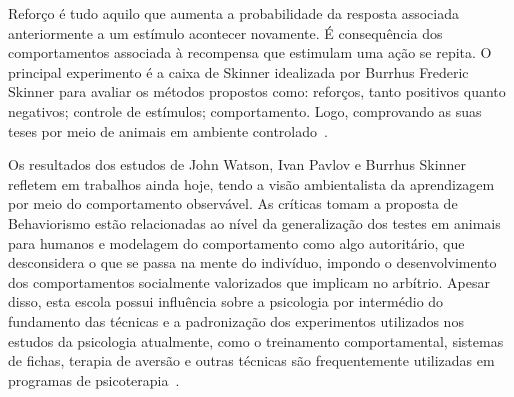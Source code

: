 Reforço é tudo aquilo que aumenta a probabilidade da resposta associada anteriormente a um estímulo acontecer novamente. É consequência dos comportamentos associada à recompensa que estimulam uma ação se repita.
O principal experimento é a caixa de Skinner idealizada por Burrhus Frederic Skinner para avaliar os  métodos propostos como: reforços, tanto positivos quanto negativos; controle de estímulos; comportamento.
Logo, comprovando as suas teses por meio de animais em ambiente controlado~\cite{silva2007psicologia_educacao}.

Os resultados dos estudos de John Watson, Ivan Pavlov e Burrhus Skinner refletem em trabalhos ainda hoje, tendo a visão ambientalista da aprendizagem por meio do comportamento observável. 
As críticas tomam a proposta de Behaviorismo estão relacionadas ao nível da generalização dos testes em animais para humanos e modelagem do comportamento como algo autoritário, que desconsidera o que se passa na mente do indivíduo, impondo o desenvolvimento dos comportamentos socialmente valorizados que implicam no arbítrio.
Apesar disso, esta escola possui influência sobre a psicologia por intermédio do fundamento das técnicas e a padronização dos experimentos utilizados nos estudos da psicologia atualmente, como o treinamento comportamental, sistemas de fichas, terapia de aversão e outras técnicas são frequentemente utilizadas em programas de psicoterapia~\cite{sternberg2000psicologia}.
